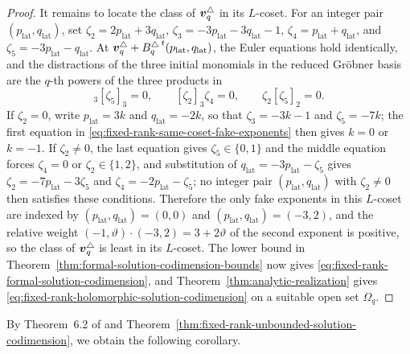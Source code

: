 \begin{proof}
	It remains to locate the class of \(\boldsymbol{v}_q^\triangle\) in its \(L\)-coset.
	For an integer pair \((p_{\mathrm{lat}},q_{\mathrm{lat}})\), set \(\zeta_2=2p_{\mathrm{lat}}+3q_{\mathrm{lat}}\), \(\zeta_3=-3p_{\mathrm{lat}}-3q_{\mathrm{lat}}-1\), \(\zeta_4=p_{\mathrm{lat}}+q_{\mathrm{lat}}\), and \(\zeta_5=-3p_{\mathrm{lat}}-q_{\mathrm{lat}}\).
	At \(\boldsymbol{v}_q^\triangle+B_q^\triangle\prescript{t}{}{(p_{\mathrm{lat}},q_{\mathrm{lat}})}\), the Euler equations hold identically, and the distractions of the three initial monomials in the reduced Gr\"obner basis are the \(q\)-th powers of the three products in
	\begin{equation}
		[\zeta_3]_3[\zeta_5]_3=0,
		\qquad
		[\zeta_2]_3\zeta_4=0,
		\qquad
		\zeta_2[\zeta_5]_2=0.
		\label{eq:fixed-rank-same-coset-fake-exponents}
	\end{equation}
	If \(\zeta_2=0\), write \(p_{\mathrm{lat}}=3k\) and \(q_{\mathrm{lat}}=-2k\), so that \(\zeta_3=-3k-1\) and \(\zeta_5=-7k\); the first equation in \eqref{eq:fixed-rank-same-coset-fake-exponents} then gives \(k=0\) or \(k=-1\).
	If \(\zeta_2\ne0\), the last equation gives \(\zeta_5\in\{0,1\}\) and the middle equation forces \(\zeta_4=0\) or \(\zeta_2\in\{1,2\}\), and substitution of \(q_{\mathrm{lat}}=-3p_{\mathrm{lat}}-\zeta_5\) gives \(\zeta_2=-7p_{\mathrm{lat}}-3\zeta_5\) and \(\zeta_4=-2p_{\mathrm{lat}}-\zeta_5\); no integer pair \((p_{\mathrm{lat}},q_{\mathrm{lat}})\) with \(\zeta_2\ne0\) then satisfies these conditions.
	Therefore the only fake exponents in this \(L\)-coset are indexed by \((p_{\mathrm{lat}},q_{\mathrm{lat}})=(0,0)\) and \((p_{\mathrm{lat}},q_{\mathrm{lat}})=(-3,2)\), and the relative weight \((-1,\vartheta)\cdot(-3,2)=3+2\vartheta\) of the second exponent is positive, so the class of \(\boldsymbol{v}_q^\triangle\) is least in its \(L\)-coset.
	The lower bound in Theorem~\ref{thm:formal-solution-codimension-bounds} now gives \eqref{eq:fixed-rank-formal-solution-codimension}, and Theorem~\ref{thm:analytic-realization} gives \eqref{eq:fixed-rank-holomorphic-solution-codimension} on a suitable open set \(\Omega_q\).
\end{proof}
By Theorem~6.2 of \cite{Nak26} and Theorem~\ref{thm:fixed-rank-unbounded-solution-codimension}, we obtain the following corollary.

